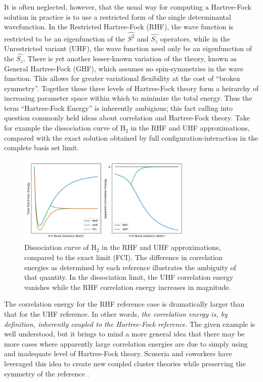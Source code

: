 \documentclass{revtex4}
\begin{document}
      It is often neglected, however, that the usual way for computing a Hartree-Fock solution in 
      practice
    is to use a restricted form of the single determinantal wavefunction. In the Restricted 
    Hartree-Fock (RHF), the wave function is restricted to be an eigenfunction of the $\hat{S^2}$ 
    and $\hat{S_z}$ 
    operators, while in the Unrestricted variant (UHF), the wave function need only be an 
    eigenfunction 
    of the $\hat{S_z}$. There is yet another lesser-known variation of the theory, known as General 
    Hartree-Fock (GHF), which assumes no spin-symmetries in the wave function. This allows for 
    greater
    variational flexibility at the cost of ``broken symmetry''. Together these three levels of 
    Hartree-Fock theory form a heirarchy of increasing parameter space within which to minimize the 
    total energy. Thus the term ``Hartree-Fock Energy'' is inherently ambigious; this fact calling 
    into question commonly held ideas about correlation and Hartree-Fock theory. Take for example 
    the dissociation curve of H$_2$ in the RHF and UHF approximations, compared with the exact 
    solution obtained by full configuration-interaction in the complete basis set limit. 
    
    \begin{figure}[H]
      \centering
      \includegraphics[width=0.75\textwidth]{../figures/H2_curves.png}
      \caption{Dissociation curve of H$_2$ in the RHF and UHF approximations, compared to the 
               exact limit (FCI). The difference in correlation energies as determined by 
               each reference illustrates the ambiguity of that quantity. In the             
               dissociation limit, the UHF correlation energy vanishes while the RHF
               correlation energy increases in magnitude.}
      \label{h2diss}
    \end{figure}
    
    The correlation energy for the RHF reference case is dramatically larger than that for the UHF 
    reference. In other words, \emph{the correlation energy is, by definition, inherently coupled 
    to the 
    Hartree-Fock reference}. The given example is well understood, but it brings to mind a more 
    general idea that there may be more cases where apparently large correlation energies are due 
    to simply 
    using and inadequate level of Hartree-Fock theory. Scuseria and coworkers have leveraged this 
    idea to create new coupled cluster theories while preserving the symmetry of the reference 
    \cite{Gomez2016}. 
    
\end{document}
